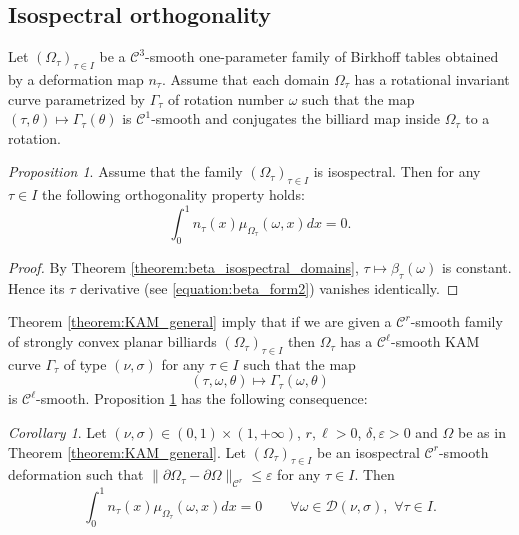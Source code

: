 \documentclass[12pt, openany]{amsart}
\theoremstyle{definition}
\theoremstyle{remark}
\theoremstyle{remark}
\theoremstyle{theorem}
\theoremstyle{theorem}
\theoremstyle{theorem}
\newtheorem{proposition}[theorem]{Proposition}
\theoremstyle{theorem}
\newtheorem{corollary}[theorem]{Corollary}
\begin{document}
\subsection{Isospectral orthogonality}
\label{subsection:isospectral_orthogonality}

Let $(\Omega_{\tau})_{\tau\in I}$ be a $\mathscr C^3$-smooth one-parameter family of Birkhoff tables obtained by a deformation map $n_{\tau}$. Assume that each domain $\Omega_{\tau}$ has a rotational invariant curve parametrized by $\Gamma_{\tau}$ of rotation number $\omega$ such that the map $(\tau,\theta)\mapsto\Gamma_{\tau}(\theta)$ is $\mathscr C^1$-smooth  and conjugates the billiard map inside $\Omega_{\tau}$ to a rotation.

\begin{proposition}
\label{proposition:othogonality_property}
Assume that the family $(\Omega_{\tau})_{\tau\in I}$ is isospectral. Then for any $\tau\in I$ the following orthogonality property holds:
\begin{equation}
\label{equation:isospectral_orthonality2}
\int_0^{1}n_{\tau}(x)\mu_{\Omega_{\tau}}(\omega,x)dx = 0.
\end{equation}
\end{proposition}

\begin{proof}
By Theorem \ref{theorem:beta_isospectral_domains}, $\tau\mapsto\beta_{\tau}(\omega)$ is constant. Hence its $\tau$ derivative (see \eqref{equation:beta_form2}) vanishes identically. 
\end{proof}

Theorem \ref{theorem:KAM_general} imply that if we are given a $\mathscr C^{r}$-smooth family of strongly convex planar billiards $(\Omega_{\tau})_{\tau\in I}$ then $\Omega_{\tau}$ has a $\mathscr C^{\ell}$-smooth KAM curve $\Gamma_{\tau}$ of type $(\nu,\sigma)$ for any $\tau\in I$ such that the map 
\[
(\tau,\omega,\theta)\mapsto \Gamma_{\tau}(\omega,\theta)
\]
is $\mathscr C^{\ell}$-smooth. Proposition \ref{proposition:othogonality_property} has the following consequence:

\begin{corollary}
\label{corollary:orthogonality_property}
Let 
$(\nu,\sigma)\in(0,1)\times(1,+\infty)$, 
$r,\ell>0$, $\delta,\varepsilon>0$ and $\Omega$ be as in Theorem \ref{theorem:KAM_general}. Let $(\Omega_{\tau})_{\tau\in I}$ be an isospectral $\mathscr C^r$-smooth deformation such that $\|\partial\Omega_{\tau}-\partial\Omega\|_{\mathscr C^r}\leq \varepsilon$ for any $\tau\in I$.
Then
\begin{equation}
\label{equation:isospectral_orthonality}
\int_0^{1}n_{\tau}(x)\mu_{\Omega_{\tau}}(\omega,x)dx = 0\qquad \forall\omega\in\mathcal D(\nu,\sigma),\,\,\forall\tau\in I.
\end{equation}
\end{corollary}
\end{document}

